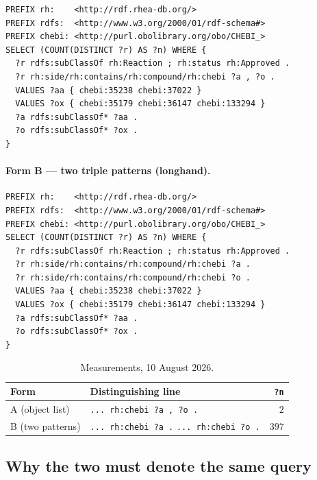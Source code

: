\documentclass[11pt,a4paper]{article}
\theoremstyle{plain}
\theoremstyle{definition}
\theoremstyle{remark}
\begin{document}
\begin{lstlisting}[caption={Form A. Returns \textbf{2}.},label=lst:comma]
PREFIX rh:    <http://rdf.rhea-db.org/>
PREFIX rdfs:  <http://www.w3.org/2000/01/rdf-schema#>
PREFIX chebi: <http://purl.obolibrary.org/obo/CHEBI_>
SELECT (COUNT(DISTINCT ?r) AS ?n) WHERE {
  ?r rdfs:subClassOf rh:Reaction ; rh:status rh:Approved .
  ?r rh:side/rh:contains/rh:compound/rh:chebi ?a , ?o .
  VALUES ?aa { chebi:35238 chebi:37022 }
  VALUES ?ox { chebi:35179 chebi:36147 chebi:133294 }
  ?a rdfs:subClassOf* ?aa .
  ?o rdfs:subClassOf* ?ox .
}
\end{lstlisting}

\paragraph{Form B --- two triple patterns (longhand).}

\begin{lstlisting}[caption={Form B. Returns \textbf{397}. Differs from Form A only at lines 6--7.},label=lst:longhand]
PREFIX rh:    <http://rdf.rhea-db.org/>
PREFIX rdfs:  <http://www.w3.org/2000/01/rdf-schema#>
PREFIX chebi: <http://purl.obolibrary.org/obo/CHEBI_>
SELECT (COUNT(DISTINCT ?r) AS ?n) WHERE {
  ?r rdfs:subClassOf rh:Reaction ; rh:status rh:Approved .
  ?r rh:side/rh:contains/rh:compound/rh:chebi ?a .
  ?r rh:side/rh:contains/rh:compound/rh:chebi ?o .
  VALUES ?aa { chebi:35238 chebi:37022 }
  VALUES ?ox { chebi:35179 chebi:36147 chebi:133294 }
  ?a rdfs:subClassOf* ?aa .
  ?o rdfs:subClassOf* ?ox .
}
\end{lstlisting}

\begin{table}[H]
\centering
\small
\caption{Measurements, 10 August 2026.}
\label{tab:runs}
\begin{tabular}{llr}
\toprule
Form & Distinguishing line & \texttt{?n} \\
\midrule
A (object list)      & \texttt{... rh:chebi ?a , ?o .}                          & $2$ \\
B (two patterns)     & \texttt{... rh:chebi ?a .} \; \texttt{... rh:chebi ?o .} & $397$ \\
\bottomrule
\end{tabular}
\end{table}

\subsection{Why the two must denote the same query}
\label{sec:spec}
\end{document}
